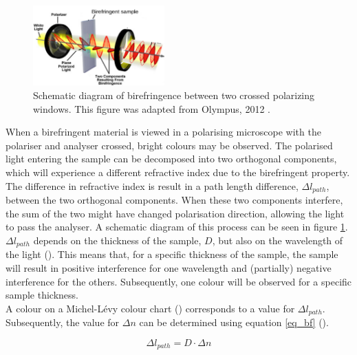 \begin{figure}
	\centering
	\includegraphics[width=0.45\textwidth]{afbeeldingen/bf_principle.png}
	\caption{Schematic diagram of birefringence between two crossed polarizing windows. This figure was adapted from Olympus, 2012 \cite{olympus}.}
	\label{fig_bf_diagram}
\end{figure}

When a birefringent material is viewed in a polarising microscope with the polariser and analyser crossed, bright colours may be observed. The polarised light entering the sample can be decomposed into two orthogonal components, which will experience a different refractive index due to the birefringent property. The difference in refractive index is result in a path length difference, $\Delta l_{path}$, between the two orthogonal components. When these two components interfere, the sum of the two might have changed polarisation direction, allowing the light to pass the analyser. A schematic diagram of this process can be seen in figure \ref{fig_bf_diagram}. \\
$\Delta l_{path}$ depends on the thickness of the sample, $D$, but also on the wavelength of the light (\cite{hecht}). This means that, for a specific thickness of the sample, the sample will result in positive interference for one wavelength and (partially) negative interference for the others. Subsequently, one colour will be observed for a specific sample thickness.\\
A colour on a Michel-L\'evy colour chart (\cite{bf_chart}) corresponds to a value for $\Delta l_{path}$. Subsequently, the value for $\Delta n$ can be determined using equation \eqref{eq_bf} (\cite{hecht}).

\begin{equation}
	\label{eq_bf}
	\Delta l_{path} = D \cdot \Delta n
\end{equation}


\bigskip
\vspace{5mm}



